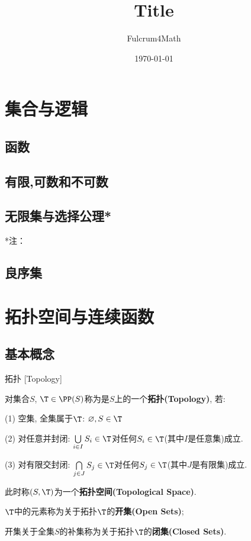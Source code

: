 \documentclass[UTF8]{ctexart}
\title{Title}
\author{Fulcrum4Math}
\date{\today}
\begin{document}
\tableofcontents
\newpage

    \section{集合与逻辑}
        
        \subsection{函数}

        \subsection{有限,可数和不可数}
            
        \subsection{无限集与选择公理*}

        *注：
            
        \subsection{良序集}
            

    \section{拓扑空间与连续函数}

        \subsection{基本概念}

            \begin{dfn}
                {拓扑}
                [Topology]
                
                对集合$S$, $\T\in\PP(S)$称为是$S$上的一个\textbf{拓扑(Topology)}, 若: 

                (1) 空集, 全集属于$\T$: $\varnothing, S\in \T$

                (2) 对任意并封闭: $\bigcup\limits_{i\in I} S_i\in\T$对任何$S_i\in\T$(其中$I$是任意集)成立. 

                (3) 对有限交封闭: $\bigcap\limits_{j\in J} S_j\in\T$对任何$S_j\in\T$(其中$J$是有限集)成立. 

                此时称$(S, \T)$为一个\textbf{拓扑空间(Topological Space)}. 

                $\T$中的元素称为关于拓扑$\T$的\textbf{开集(Open Sets)}; 
                
                开集关于全集$S$的补集称为关于拓扑$\T$的\textbf{闭集(Closed Sets)}. 


            \end{dfn}
\end{document}
